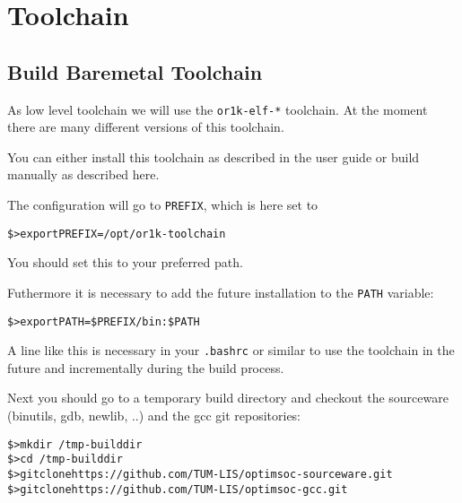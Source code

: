 \chapter{Toolchain}
\label{chap:toolchain}

\section{Build Baremetal Toolchain}

As low level toolchain we will use the \verb|or1k-elf-*| toolchain. At
the moment there are many different versions of this toolchain.

You can either install this toolchain as described in the user guide
or build manually as described here.

The configuration will go to \verb|PREFIX|, which is here set to

\begin{alltt}
\$> export PREFIX=/opt/or1k-toolchain
\end{alltt}

You should set this to your preferred path.

Futhermore it is necessary to add the future installation to the
\verb|PATH| variable:

\begin{alltt}
\$> export PATH=\$PREFIX/bin:\$PATH
\end{alltt}

A line like this is necessary in your \verb|.bashrc| or similar to use
the toolchain in the future and incrementally during the build
process.

Next you should go to a temporary build directory and checkout
the sourceware (binutils, gdb, newlib, ..) and the gcc git
repositories:

\begin{alltt}
\$> mkdir ~/tmp-builddir
\$> cd ~/tmp-builddir
\$> git clone https://github.com/TUM-LIS/optimsoc-sourceware.git
\$> git clone https://github.com/TUM-LIS/optimsoc-gcc.git
\end{alltt}

%
%

